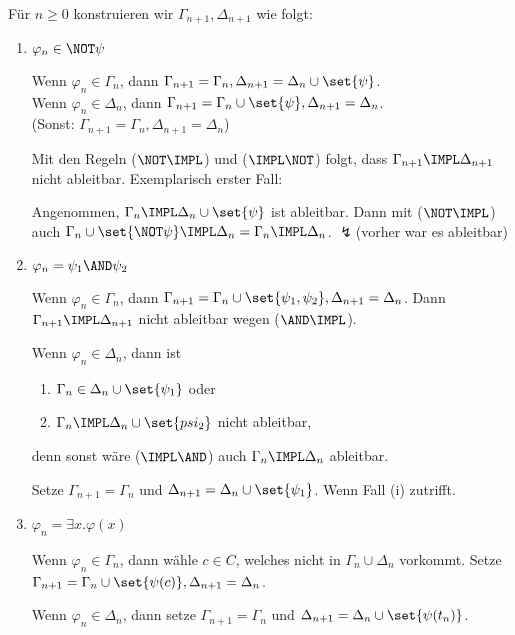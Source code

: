 Für $n\geq 0$ konstruieren wir $\Gamma_{n+1}, \Delta_{n+1}$ wie folgt:

\begin{enumerate}
  \item $\varphi_n \in \NOT\psi$
  
  Wenn $\varphi_n \in \Gamma_n$, dann $\Gamma_{n+1}=\Gamma_n, \Delta_{n+1}=\Delta_n\cup\set{\psi}$.\\
  Wenn $\varphi_n \in \Delta_n$, dann $\Gamma_{n+1}=\Gamma_n\cup\set{\psi}, \Delta_{n+1}=\Delta_n$.\\
  (Sonst: $\Gamma_{n+1}=\Gamma_n, \Delta_{n+1}=\Delta_n$)
  
  Mit den Regeln ($\NOT\IMPL$) und ($\IMPL\NOT$) folgt, dass $\Gamma_{n+1}\IMPL\Delta_{n+1}$ nicht ableitbar.
  Exemplarisch erster Fall:
  
  Angenommen, $\Gamma_n\IMPL\Delta_n\cup\set{\psi}$ ist ableitbar. Dann mit ($\NOT\IMPL$)
  auch $\Gamma_n\cup\set{\NOT\psi}\IMPL\Delta_n=\Gamma_n\IMPL\Delta_n$. $\lightning$(vorher war es ableitbar)
  
  \item $\varphi_n = \psi_1 \AND \psi_2$
  
  Wenn $\varphi_n \in \Gamma_n$, dann $\Gamma_{n+1}=\Gamma_n\cup\set{\psi_1,\psi_2}, \Delta_{n+1}=\Delta_n$.
  Dann $\Gamma_{n+1}\IMPL\Delta_{n+1}$ nicht ableitbar wegen ($\AND\IMPL$).
  
  Wenn $\varphi_n\in\Delta_n$, dann ist

  \begin{enumerate}[label=(\roman*)]
    \item $\Gamma_n \in \Delta_n\cup\set{\psi_1}$ oder
    \item $\Gamma_n\IMPL\Delta_n\cup\set{psi_2}$ nicht ableitbar,
  \end{enumerate}

  denn sonst wäre ($\IMPL\AND$) auch $\Gamma_n\IMPL\Delta_n$ ableitbar.
  
  Setze $\Gamma_{n+1}=\Gamma_n$ und $\Delta_{n+1}=\Delta_n\cup\set{\psi_1}$.
  Wenn Fall (i) zutrifft.
  
  \item $\varphi_n = \exists x.\varphi(x)$
  
  Wenn $\varphi_n\in\Gamma_n$, dann wähle $c\in C$, welches nicht in
  $\Gamma_n\cup\Delta_n$ vorkommt. Setze $\Gamma_{n+1}=\Gamma_n\cup\set{\psi(c)},
  \Delta_{n+1}=\Delta_n$.
  
  Wenn $\varphi_n\in\Delta_n$, dann setze $\Gamma_{n+1}=\Gamma_n$ und
  $\Delta_{n+1}=\Delta_n\cup\set{\psi(t_n)}$.
\end{enumerate}


